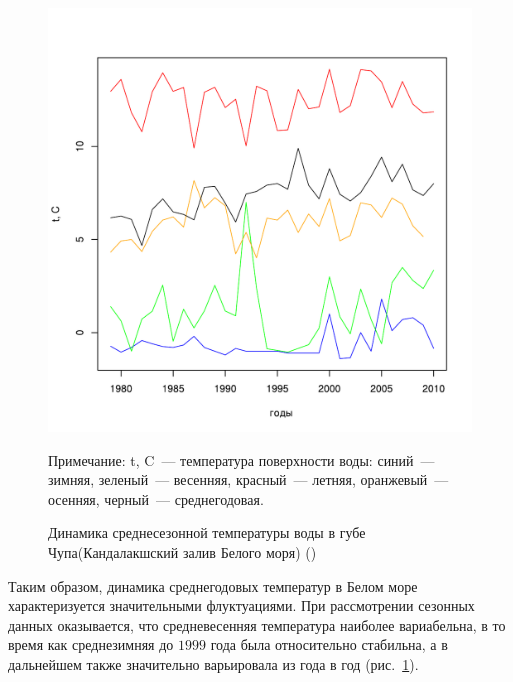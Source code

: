 	\begin{figure}[p]
    \includegraphics[width=\textwidth]{../White_Sea/temperature_Kartesh/t_mean_season_year1.pdf}
    \caption{Динамика среднесезонной температуры воды в губе Чупа(Кандалакшский залив Белого моря) (\cite{Berger_et_al_2003})}

{\footnotesize Примечание: t, C~--- температура поверхности воды: синий~--- зимняя, зеленый~--- весенняя, красный~--- летняя, оранжевый~--- осенняя, черный~--- среднегодовая. }
    \label{ris:White_temp_seasons_dynamic}
	\end{figure}


Таким образом, динамика среднегодовых температур в Белом море характеризуется значительными флуктуациями.
При рассмотрении сезонных данных оказывается, что средневесенняя температура наиболее вариабельна, в то время как среднезимняя до $1999$ года была относительно стабильна, а в дальнейшем также значительно варьировала из года в год (рис.~\ref{ris:White_temp_seasons_dynamic}).

